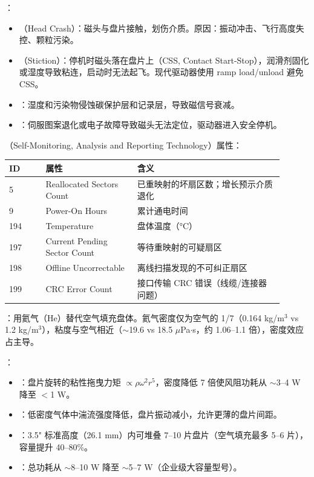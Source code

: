 ：
\begin{itemize}
\item {}（Head Crash）：磁头与盘片接触，划伤介质。原因：振动冲击、飞行高度失控、颗粒污染。
\item {}（Stiction）：停机时磁头落在盘片上（CSS, Contact Start-Stop），润滑剂固化或湿度导致粘连，启动时无法起飞。现代驱动器使用 ramp load/unload 避免 CSS。
\item {}：湿度和污染物侵蚀碳保护层和记录层，导致磁信号衰减。
\item {}：伺服图案退化或电子故障导致磁头无法定位，驱动器进入安全停机。
\end{itemize}

（Self-Monitoring, Analysis and Reporting Technology）属性：

\begin{longtable}{L{0.12\linewidth}L{0.3\linewidth}L{0.48\linewidth}}
\toprule
ID & 属性 & 含义 \\
 & Reallocated Sectors Count & 已重映射的坏扇区数；增长预示介质退化 \\
9 & Power-On Hours & 累计通电时间 \\
194 & Temperature & 盘体温度（°C） \\
197 & Current Pending Sector Count & 等待重映射的可疑扇区 \\
198 & Offline Uncorrectable & 离线扫描发现的不可纠正扇区 \\
199 & CRC Error Count & 接口传输 CRC 错误（线缆/连接器问题） \\
\bottomrule
\end{longtable}


：用氦气（He）替代空气填充盘体。氦气密度仅为空气的 1/7（0.164 kg/m$^3$ vs 1.2 kg/m$^3$），粘度与空气相近（$\sim$19.6 vs 18.5 $\mu$Pa$\cdot$s，约 1.06--1.1 倍），密度效应占主导。

：
\begin{itemize}
\item {}：盘片旋转的粘性拖曳力矩 $\propto \rho \omega^2 r^5$，密度降低 7 倍使风阻功耗从 $\sim$3--4 W 降至 $<$1 W。
\item {}：低密度气体中湍流强度降低，盘片振动减小，允许更薄的盘片间距。
\item {}：3.5" 标准高度（26.1 mm）内可堆叠 7--10 片盘片（空气填充最多 5--6 片），容量提升 40--80\%。
\item {}：总功耗从 $\sim$8--10 W 降至 $\sim$5--7 W（企业级大容量型号）。
\end{itemize}

